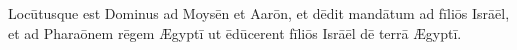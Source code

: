 Locūtusque est Dominus ad
Moysēn et Aarōn, et dēdit mandātum ad
fīliōs Isrāēl, et ad Pharaōnem rēgem Ægyptī
ut ēdūcerent fīliōs Isrāēl dē terrā Ægyptī.

%
%
%
%
